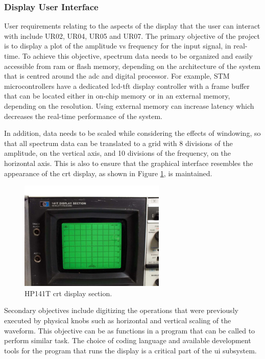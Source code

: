 \documentclass[class=report,11pt,crop=false]{standalone}
\begin{document}
	\subsubsection{Display User Interface}

	User requirements relating to the aspects of the display that the user can interact with include UR02, UR04, UR05 and UR07. The primary objective of the project is to display a plot of the amplitude vs frequency for the input signal, in real-time. To achieve this objective, spectrum data needs to be organized and easily accessible from \acrshort{ram} or flash memory, depending on the architecture of the system that is centred around the \acrshort{adc} and digital processor. For example, STM microcontrollers have a dedicated \acrshort{lcd}-\acrshort{tft} display controller with a frame buffer that can be located either in on-chip memory or in an external memory, depending on the resolution. Using external memory can increase latency which decreases the real-time performance of the system. 
	
	In addition, data needs to be scaled while considering the effects of windowing, so that all spectrum data can be translated to a grid with 8 divisions of the amplitude, on the vertical axis, and 10 divisions of the frequency, on the horizontal axis. This is also to ensure that the graphical interface resembles the appearance of the \acrshort{crt} display, as shown in Figure \ref{fig:display-section}, is maintained.
	 
	\begin{figure}[ht!]
		\centering
		\includegraphics[width=0.62\textwidth]{Figures/Methodology/HP-Display-Section}
		\caption{HP141T \acrshort{crt} display section.}
		\label{fig:display-section}
	\end{figure}
	
	Secondary objectives include digitizing the operations that were previously executed by physical knobs such as horizontal and vertical scaling of the waveform. This objective can be  as functions in a program that can be called to perform similar task. The choice of coding language and available development tools for the program that runs the display is a critical part of the \acrshort{ui} subsystem. 
	
\end{document}
